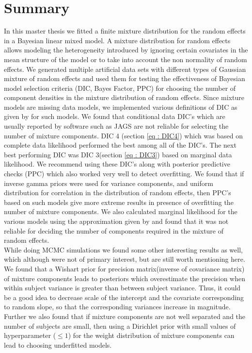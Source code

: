 
\chapter{Summary}
\label{ch : summary}

In this master thesis we fitted a finite mixture distribution for the random effects in a Bayesian linear mixed model. A mixture distribution for random effects allows modeling the heterogeneity introduced by ignoring certain covariates in the mean structure of the model or to take into account the non normality of random effects. We generated multiple artificial data sets with different types of Gaussian mixture of random effects and used them for testing the effectiveness of Bayesian model selection criteria (DIC, Bayes Factor, PPC) for choosing the number of component densities in the mixture distribution of random effects. Since mixture models are missing data models, we implemented various definitions of DIC as given by \citet{celeux_deviance_2006} for such models. We found that conditional data DIC's which are usually reported by software such as JAGS are not reliable for selecting the number of mixture components. DIC 4 (section \ref{eq : DIC4}) which was based on complete data likelihood performed the best among all of the DIC's. The next best performing DIC was DIC 3(section \ref{eq : DIC3}) based on marginal data likelihood. We recommend using these DIC's along with posterior predictive checks (PPC) which also worked very well to detect overfitting. We found that if inverse gamma priors were used for variance components, and uniform distribution for correlation in the distribution of random effects, then PPC's based on such models give more extreme results in presence of overfitting the number of mixture components. We also calculated marginal likelihood for the various models using the approximation given by \citet{chib_marginal_1995} and found that it was not reliable for deciding the number of components required in the mixture of random effects.\\

While doing MCMC simulations we found some other interesting results as well, which although were not of primary interest, but are still worth mentioning here. We found that a Wishart prior for precision matrix(inverse of covariance matrix) of mixture components leads to posteriors which overestimate the precision when within subject variance is greater than between subject variance. Thus, it could be a good idea to decrease scale of the intercept and the covariate corresponding to random slope, so that the corresponding variances increase in magnitude. Further we also found that if mixture components are not well separated and the number of subjects are small, then using a Dirichlet prior with small values of hyperparameter ($\leq 1$) for the weight distribution of mixture components can lead to choosing underfitted models.